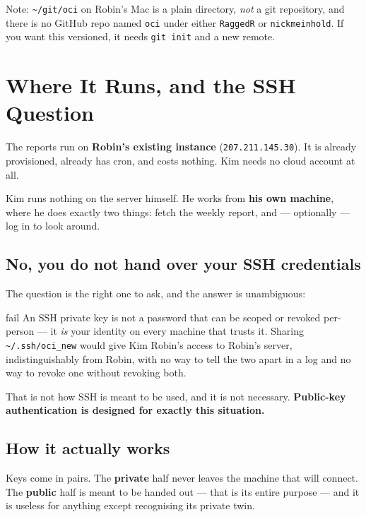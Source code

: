 \documentclass[11pt,a4paper]{article}
\begin{document}
\noindent
Note: \texttt{\textasciitilde/git/oci} on Robin's Mac is a plain
directory, \emph{not} a git repository, and there is no GitHub repo
named \texttt{oci} under either \texttt{RaggedR} or
\texttt{nickmeinhold}. If you want this versioned, it needs
\texttt{git init} and a new remote.

\section{Where It Runs, and the SSH Question}

The reports run on \textbf{Robin's existing instance}
(\texttt{207.211.145.30}). It is already provisioned, already has cron,
and costs nothing. Kim needs no cloud account at all.

Kim runs nothing on the server himself. He works from \textbf{his own
machine}, where he does exactly two things: fetch the weekly report, and
--- optionally --- log in to look around.

\subsection{No, you do not hand over your SSH credentials}

The question is the right one to ask, and the answer is unambiguous:

\begin{resultbox}{fail}
An SSH private key is not a password that can be scoped or revoked
per-person --- it \emph{is} your identity on every machine that trusts
it. Sharing \texttt{\textasciitilde/.ssh/oci\_new} would give Kim
Robin's access to Robin's server, indistinguishably from Robin, with no
way to tell the two apart in a log and no way to revoke one without
revoking both.

\vspace{0.5em}
That is not how SSH is meant to be used, and it is not necessary.
\textbf{Public-key authentication is designed for exactly this
situation.}
\end{resultbox}

\subsection{How it actually works}

Keys come in pairs. The \textbf{private} half never leaves the machine
that will connect. The \textbf{public} half is meant to be handed out
--- that is its entire purpose --- and it is useless for anything except
recognising its private twin.
\end{document}
